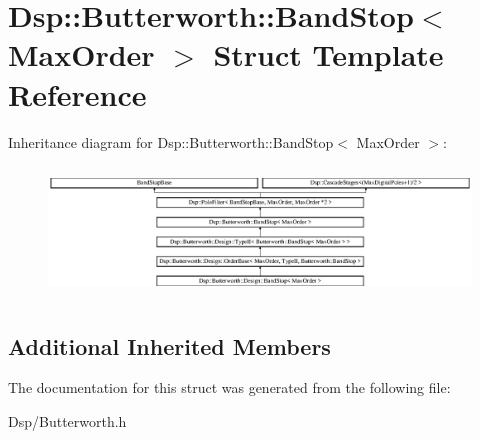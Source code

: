 \hypertarget{structDsp_1_1Butterworth_1_1BandStop}{\section{Dsp\-:\-:Butterworth\-:\-:Band\-Stop$<$ Max\-Order $>$ Struct Template Reference}
\label{structDsp_1_1Butterworth_1_1BandStop}
}
Inheritance diagram for Dsp\-:\-:Butterworth\-:\-:Band\-Stop$<$ Max\-Order $>$\-:\begin{figure}[H]
\begin{center}
\leavevmode
\includegraphics[height=3.478261cm]{structDsp_1_1Butterworth_1_1BandStop}
\end{center}
\end{figure}
\subsection*{Additional Inherited Members}


The documentation for this struct was generated from the following file\-:\begin{DoxyCompactItemize}
\item 
Dsp/Butterworth.\-h\end{DoxyCompactItemize}
